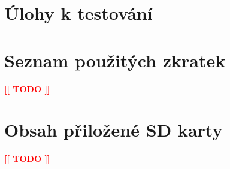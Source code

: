 \documentclass[thesis=B,czech,hidelinks]{template/FITthesis}
\newcommand{\todo}[1]{\textcolor{red}{\textbf{[[ #1 ]]}}}
\begin{document}












\printbibliography

\appendix

\chapter{Úlohy k testování}
\label{chap:excercises}


\chapter{Seznam použitých zkratek}
\todo{TODO}

\chapter{Obsah přiložené SD karty}
\todo{TODO}
\end{document}
